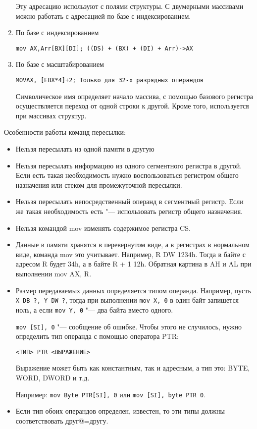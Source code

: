 \begin{enumerate}
    Эту адресацию используют с полями структуры. С двумерными массивами можно работать с адресацией по базе с индексированием.
    
    \item По базе с индексированием
    
    \verb|mov AX,Arr[BX][DI]; ((DS) + (BX) + (DI) + Arr)->AX|

    \item По базе с масштабированием
    
    \verb|MOVAX, [EBX*4]+2; Только для 32-х разрядных операндов|

Символическое имя определяет начало массива, с помощью базового регистра осуществляется
переход от одной строки к другой. Кроме того, используется при массивах структур.
   
\end{enumerate}

Особенности работы команд пересылки:
\begin{itemize}
    \item Нельзя пересылать из одной памяти в другую
    \item Нельзя пересылать информацию из одного сегментного регистра в другой.
    Если есть такая необходимость нужно воспользоваться регистром общего назначения или стеком
    для промежуточной пересылки.
    \item Нельзя пересылать непосредственный операнд в сегментный регистр. Если же такая
    необходимость есть "--- использовать регистр общего назначения.
    \item Нельзя командой mov изменять содержимое регистра CS.
    \item Данные в памяти хранятся в перевернутом виде, а в регистрах в нормальном
    виде, команда mov это учитывает.
    Например, R DW 1234h. Тогда в байте с адресом R будет 34h, а в байте R + 1 12h.
    Обратная картина в AH и AL при выполнении mov AX, R.
    \item Размер передаваемых данных определяется типом операнда.
    Например, пусть \verb|X DB ?, Y DW ?|, тогда при выполнении \verb|mov X, 0| в один байт запишется
    ноль, а если \verb|mov Y, 0| "--- два байта вместо одного.

    \verb|mov [SI], 0| "--- сообщение об ошибке. Чтобы этого не случилось, нужно определить
    тип операнда с помощью оператора PTR:

    \verb|<ТИП> PTR <ВЫРАЖЕНИЕ>|

    Выражение может быть как константным, так и адресным, а тип это: BYTE, WORD, DWORD и т.д.

    Например: \verb|mov Byte PTR[SI], 0| или \verb|mov [SI], byte PTR 0|.
    \item Если тип обоих операндов определен, известен, то эти типы должны соответствовать друг@=другу.
\end{itemize}

